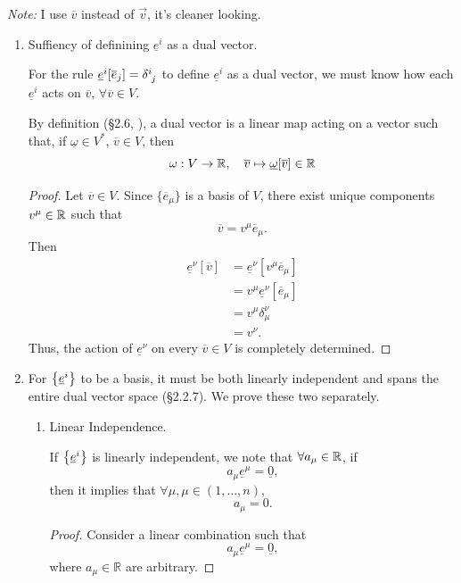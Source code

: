\documentclass[12pt,a4paper]{article}
\newcommand{\und}[1]{\underline{#1}}
\newcommand{\ovr}[1]{\overline{#1}}
\begin{document}
\begin{solution_pset}
		\textit{Note:} I use $\ovr{v}$ instead of $\vec{v}$, it's cleaner looking.

		\begin{enumerate}[(1)]
			\item Suffiency of definining $\und{e}^i$ as a dual vector.

				For the rule $\und{e}^i[\ovr{e}_j]=\delta\indices{^i_j}$ to define $\und{e}^i$ as a dual vector, 
				  we must know how 
				  each $\und{e}^i$ acts on $\ovr{v}$, $\forall \ovr{v}\in V$.

				  By definition (\S 2.6, \cite{juan2026}), a dual vector
				  is a linear map acting on a vector such that, if $\und\omega\in V^*$,
				  $\ovr v\in V$, then
				  \[
					  \omega: V\to \R,\quad \ovr v \mapsto\und\omega[\ovr v]\in \R
				  \]

					\begin{proof}
						Let $\ovr v\in V$. Since $\{\ovr{e}_\mu\}$ is a basis of $V$,
						there exist unique components $v^\mu\in\mathbb{R}$ such that
						\[
							\ovr{v}=v^\mu \ovr{e}_\mu.
						\]
						Then
						\begin{align*}
							\und{e}^\nu[\ovr v]
							&=\und{e}^\nu[v^\mu \ovr{e}_\mu]\\
							&=v^\mu \und{e}^\nu[\ovr{e}_\mu]\\
							&=v^\mu \delta^\nu_\mu\\
							&=v^\nu.
						\end{align*}
						Thus, the action of $\und{e}^\nu$ on every $\ovr v\in V$ is
						completely determined. 
					\end{proof}
			\item For $\qty{\und{e}^i}$ to be a basis, it must be both linearly independent and 
				spans the entire dual vector space (\S 2.2.7\cite{juan2026}). We prove these two separately.
			
				\begin{enumerate}

					\item Linear Independence.

						If $\qty{\und{e}^i}$ is linearly independent, we note that
						$\forall a_\mu \in \mathbb{R}$, if
						\[
							a_\mu \und{e}^\mu =\und 0,
						\]
						then it implies that $\forall \mu, \mu \in (1,\ldots,n)$,
						\[
							a_\mu = 0.
						\]
						\begin{proof}
							Consider a linear combination such that
							\[
								a_\mu \und e^\mu = \und 0,
							\]
							where $a_\mu\in\mathbb{R}$ are arbitrary.


\end{proof}
\end{enumerate}
\end{enumerate}
\end{solution_pset}
\end{document}
